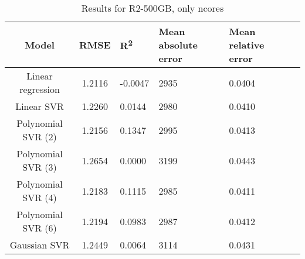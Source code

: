 \begin{table}[H]
\centering
\begin{adjustbox}{center}
\begin{tabular}{c | c M{1.2cm} M{2.5cm} M{2.5cm} M{1.8cm}}
Model & RMSE & R\textsuperscript{2} & Mean absolute error & Mean relative error \tabularnewline
\hline
Linear regression & 1.2116 & -0.0047 &   2935 & 0.0404 \\
Linear SVR & 1.2260 & 0.0144 &   2980 & 0.0410 \\
Polynomial SVR (2) & 1.2156 & 0.1347 &   2995 & 0.0413 \\
Polynomial SVR (3) & 1.2654 & 0.0000 &   3199 & 0.0443 \\
Polynomial SVR (4) & 1.2183 & 0.1115 &   2985 & 0.0411 \\
Polynomial SVR (6) & 1.2194 & 0.0983 &   2987 & 0.0412 \\
Gaussian SVR & 1.2449 & 0.0064 &   3114 & 0.0431 \\
\end{tabular}
\end{adjustbox}
\\
\caption{Results for R2-500GB, only ncores}
\label{tab:only_1_linear_R2_500}
\end{table}
